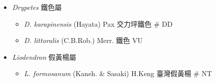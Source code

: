 
  \begin{itemize}
 \item[] \textit{Drypetes} 鐵色屬
                                
  \begin{itemize}
        \item[] \textit{D. karapinensis} (Hayata) Pax  交力坪鐵色  \# DD
        \item[] \textit{D. littoralis} (C.B.Rob.) Merr.  鐵色   VU
  \end{itemize}
 \item[] \textit{Liodendron} 假黃楊屬
                                
  \begin{itemize}
        \item[] \textit{L. formosanum} (Kaneh. \& Sasaki) H.Keng  臺灣假黃楊  \# NT
  \end{itemize}
  \end{itemize}
